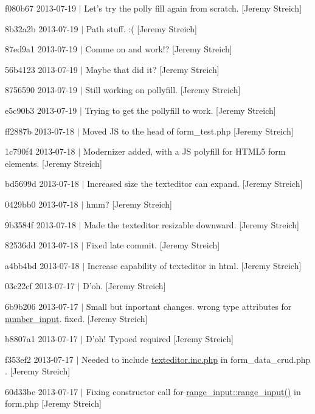 \begin{DoxyItemize}
\item f080b67 2013-\/07-\/19 $|$ Let's try the polly fill again from scratch. \mbox{[}Jeremy Streich\mbox{]}
\item 8b32a2b 2013-\/07-\/19 $|$ Path stuff. \-:( \mbox{[}Jeremy Streich\mbox{]}
\item 87ed9a1 2013-\/07-\/19 $|$ Comme on and work!? \mbox{[}Jeremy Streich\mbox{]}
\item 56b4123 2013-\/07-\/19 $|$ Maybe that did it? \mbox{[}Jeremy Streich\mbox{]}
\item 8756590 2013-\/07-\/19 $|$ Still working on pollyfill. \mbox{[}Jeremy Streich\mbox{]}
\item e5c90b3 2013-\/07-\/19 $|$ Trying to get the pollyfill to work. \mbox{[}Jeremy Streich\mbox{]}
\item ff2887b 2013-\/07-\/18 $|$ Moved J\-S to the head of form\-\_\-test.\-php \mbox{[}Jeremy Streich\mbox{]}
\item 1c790f4 2013-\/07-\/18 $|$ Modernizer added, with a J\-S polyfill for H\-T\-M\-L5 form elements. \mbox{[}Jeremy Streich\mbox{]}
\item bd5699d 2013-\/07-\/18 $|$ Increased size the texteditor can expand. \mbox{[}Jeremy Streich\mbox{]}
\item 0429bb0 2013-\/07-\/18 $|$ hmm? \mbox{[}Jeremy Streich\mbox{]}
\item 9b3584f 2013-\/07-\/18 $|$ Made the texteditor resizable downward. \mbox{[}Jeremy Streich\mbox{]}
\item 82536dd 2013-\/07-\/18 $|$ Fixed late commit. \mbox{[}Jeremy Streich\mbox{]}
\item a4bb4bd 2013-\/07-\/18 $|$ Increase capability of texteditor in html. \mbox{[}Jeremy Streich\mbox{]}
\item 03c22cf 2013-\/07-\/17 $|$ D'oh. \mbox{[}Jeremy Streich\mbox{]}
\item 6b9b206 2013-\/07-\/17 $|$ Small but inportant changes. wrong type attributes for \hyperlink{classnumber__input}{number\-\_\-input}. fixed. \mbox{[}Jeremy Streich\mbox{]}
\item b8807a1 2013-\/07-\/17 $|$ D'oh! Typoed required \mbox{[}Jeremy Streich\mbox{]}
\item f353ef2 2013-\/07-\/17 $|$ Needed to include \hyperlink{texteditor_8inc_8php}{texteditor.\-inc.\-php} in form\-\_\-data\-\_\-crud.\-php . \mbox{[}Jeremy Streich\mbox{]}
\item 60d33be 2013-\/07-\/17 $|$ Fixing constructor call for \hyperlink{classrange__input_a6038a3b2b1499abb08ff6a10ac7a8e81}{range\-\_\-input\-::range\-\_\-input()} in form.\-php \mbox{[}Jeremy Streich\mbox{]}

\end{DoxyItemize}
